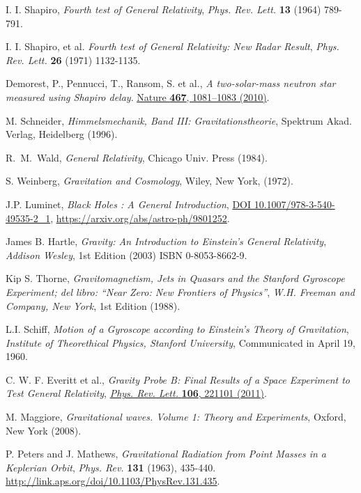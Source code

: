 \begin{thebibliography}{99}
 I. I. Shapiro,  {\em Fourth test of General Relativity}, {\sl Phys. Rev. Lett.} {\bf 13} (1964) 789-791.

 I. I. Shapiro, et al. {\em Fourth test of General Relativity: New Radar Result}, {\sl Phys. Rev. Lett.} {\bf 26} (1971) 1132-1135.

 Demorest, P., Pennucci, T., Ransom, S. et al., \textit{A two-solar-mass neutron star measured using Shapiro delay}. \href{https://doi.org/10.1038/nature09466}{Nature \textbf{467}, 1081–1083 (2010)}.

M. Schneider, {\em Himmelsmechanik, Band III:
Gravitationstheorie}, Spektrum Akad. Verlag, Heidelberg (1996).

 R.~M.~Wald, {\em General Relativity},  Chicago Univ. Press (1984).

 S. Weinberg, {\em Gravitation and Cosmology}, Wiley, New
York, (1972).

 J.P. Luminet, {\em Black Holes : A General Introduction}, \href{http://dx.doi.org/10.1007/978-3-540-49535-2\_1}{DOI 10.1007/978-3-540-49535-2\_1}, \url{https://arxiv.org/abs/astro-ph/9801252}.






James B. Hartle, {\it Gravity: An Introduction to Einstein's General Relativity},
{\sl Addison Wesley}, 1st Edition (2003) ISBN 0-8053-8662-9.

Kip S. Thorne, {\it Gravitomagnetism, Jets in Quasars and the Stanford Gyroscope Experiment; del libro: ``Near Zero: New Frontiers of Physics''},
{\sl W.H. Freeman and Company, New York}, 1st Edition (1988).

L.I. Schiff, {\it Motion of a Gyroscope according to Einstein's Theory of Gravitation},
{\sl Institute of Theorethical Physics, Stanford University}, Communicated in April 19, 1960.



C. W. F. Everitt et al., {\it Gravity Probe B: Final Results of a Space Experiment to Test General Relativity}, \href{http://dx.doi.org/10.1103/PhysRevLett.106.221101}{{\it Phys. Rev. Lett.} {\bf 106}, 221101 (2011)}.

 M. Maggiore, {\em  Gravitational waves. Volume 1: Theory and Experiments}, Oxford, New York (2008).

P. Peters and J. Mathews, {\em Gravitational Radiation from Point Masses in a Keplerian Orbit}, {\sl Phys. Rev.} {\bf 131} (1963), 435-440. \url{http://link.aps.org/doi/10.1103/PhysRev.131.435}.


\end{thebibliography}
